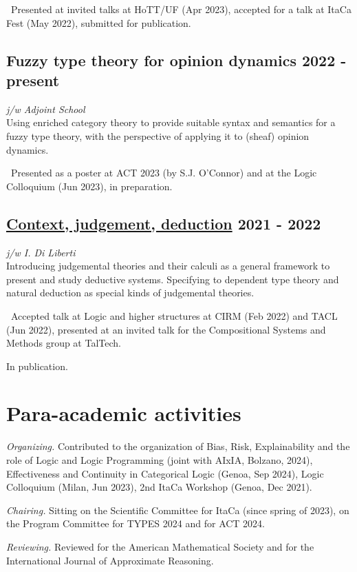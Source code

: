 \documentclass[a4paper,9pt]{article}
\begin{document}
\, Presented at invited talks at HoTT/UF (Apr 2023), accepted for a talk at ItaCa Fest (May 2022), submitted for publication.

\subsection*{Fuzzy type theory for opinion dynamics \hfill 2022 - present}
\textit{j/w Adjoint School}\\
Using enriched category theory to provide suitable syntax and semantics for a fuzzy type theory, with the perspective of applying it to (sheaf) opinion dynamics.

\, Presented as a poster at ACT 2023 (by S.J. O'Connor) and at the Logic Colloquium (Jun 2023), in preparation.

\subsection*{\href{https://arxiv.org/abs/2111.09438}{Context, judgement, deduction} \hfill 2021 - 2022}
\textit{j/w I. Di Liberti}\\
Introducing judgemental theories and their calculi as a general framework to present and study deductive systems. Specifying to dependent type theory and natural deduction as special kinds of judgemental theories.

\, Accepted talk at Logic and higher structures at CIRM (Feb 2022) and TACL (Jun 2022), presented at an invited talk for the Compositional Systems and Methods group at TalTech.

 In publication.

\section*{ Para-academic activities}
\textit{Organizing.} Contributed to the organization of Bias, Risk, Explainability and the role of Logic and Logic Programming (joint with AIxIA, Bolzano, 2024), Effectiveness and Continuity in Categorical Logic (Genoa, Sep 2024), Logic Colloquium (Milan, Jun 2023), 2nd ItaCa Workshop (Genoa, Dec 2021).

\textit{Chairing.} Sitting on the Scientific Committee for ItaCa (since spring of 2023), on the Program Committee for TYPES 2024 and for ACT 2024.

\textit{Reviewing.} Reviewed for the American Mathematical Society and for the International Journal of Approximate Reasoning.
\end{document}
